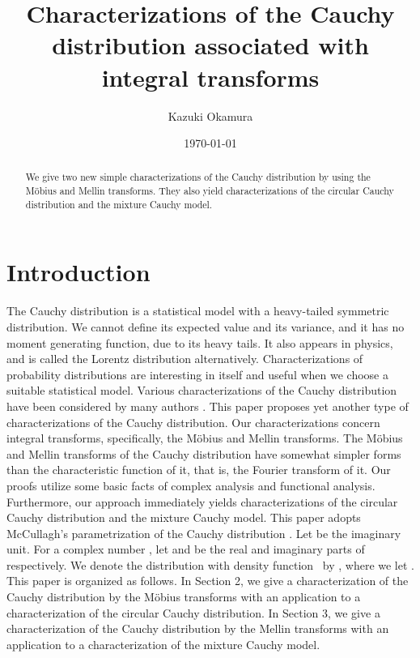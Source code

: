 \documentclass{amsart}
\theoremstyle{definition}
\begin{document}
\title{Characterizations of the Cauchy distribution associated with integral transforms}
\author{Kazuki Okamura}
\address{School of General Education, Shinshu University}
\date{\today}
\maketitle
\begin{abstract}
We give two new simple characterizations of the Cauchy distribution by using the
M\"obius and Mellin transforms.
They
also yield characterizations of the circular Cauchy distribution and the mixture Cauchy model.
\end{abstract}
\section{Introduction}
The Cauchy distribution is a statistical model with a heavy-tailed symmetric distribution.
We cannot define its expected value and its variance, and it has no moment generating function, due to its heavy tails.
It also appears in physics, and is called the Lorentz distribution alternatively.
Characterizations of probability distributions are interesting in itself and useful when we choose a suitable statistical model.
Various characterizations of the Cauchy distribution have been considered by many authors \cite{Arnold1979,Arnold1990, Bell1985, Chin2020, Dunau1987, Hamedani1993, Hassenforder1988, Knight1976b, Knight1976a, Letac1977, Menon1962, Menon1966, Norton1983, Obretenov1961, Ramachandran1970, Williams1969, Yanushkevichius2007,Yanushkevichius2014}.
This paper proposes yet another type of characterizations of the Cauchy distribution.
Our characterizations concern
integral transforms, specifically, the M\"obius and Mellin transforms.
The M\"obius and Mellin transforms of the Cauchy distribution have somewhat simpler forms than the characteristic function of it, that is, the Fourier transform of it.
Our proofs utilize some basic facts of complex analysis and functional analysis.
Furthermore, our approach immediately yields characterizations of the circular Cauchy distribution and the mixture Cauchy model.
This paper adopts McCullagh's parametrization of the Cauchy distribution \cite{McCullagh1996}.
Let   be the imaginary unit.
For a complex number  , let   and   be the real and imaginary parts of   respectively.
We denote the distribution with density function
\ by  , where we let  .
This paper is organized as follows.
In Section 2, we give a characterization of the Cauchy distribution by the M\"obius transforms with an application to a characterization of the circular Cauchy distribution.
In Section 3, we give a characterization of the Cauchy distribution by the Mellin transforms with an application to a characterization of the mixture Cauchy model.
\end{document}
